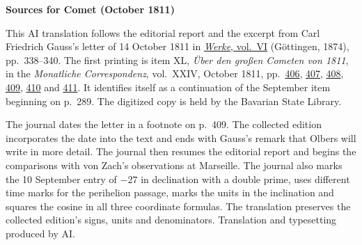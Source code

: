\clearpage\thispagestyle{empty}
\begin{center}\textbf{Sources for Comet (October 1811)}\end{center}
\noindent This AI translation follows the editorial report and the excerpt from Carl Friedrich Gauss’s letter of 14 October 1811 in \href{https://gdz.sub.uni-goettingen.de/id/PPN236007467}{\textit{Werke}, vol.~VI} (Göttingen, 1874), pp.~338--340. The first printing is item XL, \textit{Über den großen Cometen von 1811}, in the \textit{Monatliche Correspondenz}, vol.~XXIV, October 1811, pp.~\href{https://api.digitale-sammlungen.de/iiif/image/v2/bsb10538613_00418/full/1600,/0/default.jpg}{406}, \href{https://api.digitale-sammlungen.de/iiif/image/v2/bsb10538613_00419/full/1600,/0/default.jpg}{407}, \href{https://api.digitale-sammlungen.de/iiif/image/v2/bsb10538613_00420/full/1600,/0/default.jpg}{408}, \href{https://api.digitale-sammlungen.de/iiif/image/v2/bsb10538613_00421/full/1600,/0/default.jpg}{409}, \href{https://api.digitale-sammlungen.de/iiif/image/v2/bsb10538613_00422/full/1600,/0/default.jpg}{410} and \href{https://api.digitale-sammlungen.de/iiif/image/v2/bsb10538613_00423/full/1600,/0/default.jpg}{411}. It identifies itself as a continuation of the September item beginning on p.~289. The digitized copy is held by the Bavarian State Library.
\par\smallskip\noindent The journal dates the letter in a footnote on p.~409. The collected edition incorporates the date into the text and ends with Gauss’s remark that Olbers will write in more detail. The journal then resumes the editorial report and begins the comparisons with von Zach’s observations at Marseille. The journal also marks the 10 September entry of $-27$ in declination with a double prime, uses different time marks for the perihelion passage, marks the units in the inclination and squares the cosine in all three coordinate formulas. The translation preserves the collected edition’s signs, units and denominators. Translation and typesetting produced by AI.
\clearpage
